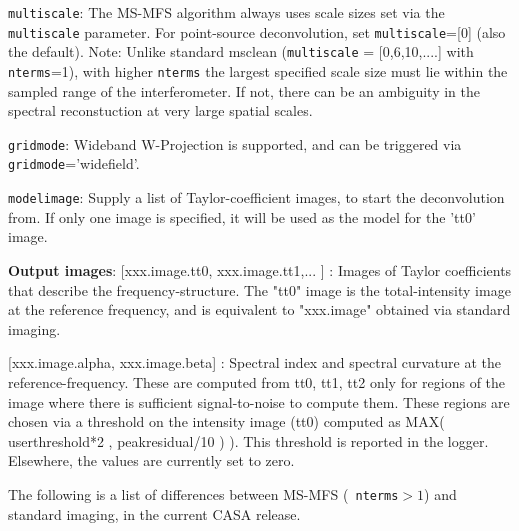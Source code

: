 {\tt multiscale}: The MS-MFS algorithm always uses scale sizes set via
the {\tt multiscale} parameter.  For point-source deconvolution, set
{\tt multiscale}=[0] (also the default).  Note: Unlike standard
msclean ({\tt multiscale} = [0,6,10,....] with {\tt nterms}=1), with
higher {\tt nterms} the largest specified scale size must lie within
the sampled range of the interferometer. If not, there can be an
ambiguity in the spectral reconstuction at very large spatial scales.

{\tt gridmode}: Wideband W-Projection is supported, and can be
triggered via {\tt gridmode}='widefield'.


{\tt modelimage}: Supply a list of Taylor-coefficient images, to start the deconvolution from.  
               If only one image is specified, it will be used as the model for the 'tt0' image. 
     

{\bf Output images}: [xxx.image.tt0,
               xxx.image.tt1,... ] : Images of Taylor coefficients
               that describe the frequency-structure.  The "tt0" image
               is the total-intensity image at the reference
               frequency, and is equivalent to "xxx.image" obtained
               via standard imaging.


               [xxx.image.alpha, xxx.image.beta] : Spectral index and
               spectral curvature at the reference-frequency. These
               are computed from tt0, tt1, tt2 only for regions of the
               image where there is sufficient signal-to-noise to
               compute them. These regions are chosen via a threshold
               on the intensity image (tt0) computed as MAX(
               userthreshold*2 , peakresidual/10 ) ). This threshold
               is reported in the logger.  Elsewhere, the values are
               currently set to zero.


The following is a list of differences between MS-MFS ({\tt
                 nterms}$>1$) and standard imaging, in the current
               CASA release.

